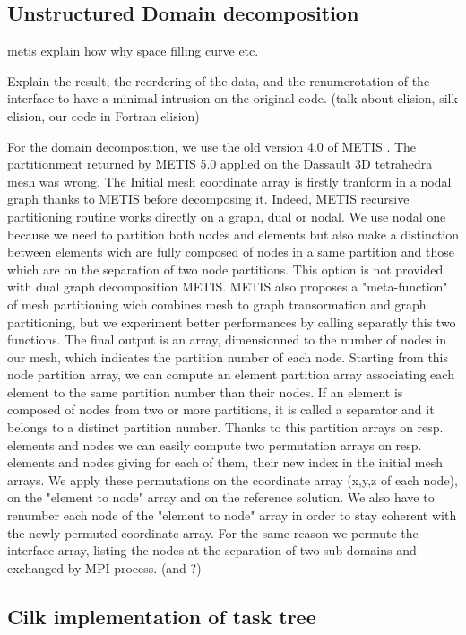\documentclass{IOS-Book-Article}
\begin{document}
\subsection{Unstructured Domain decomposition}

metis explain how why space filling curve etc.

Explain the result, the reordering of the data, and the renumerotation of the interface to have a minimal intrusion on the original code.
(talk about elision, silk elision, our code in Fortran elision)

For the domain decomposition, we use the old version 4.0 of METIS . The partitionment returned by METIS 5.0 applied on the Dassault 3D tetrahedra mesh was wrong.
The Initial mesh coordinate array is firstly tranform in a nodal graph thanks to METIS before decomposing it. Indeed, METIS recursive partitioning routine works directly
on a graph, dual or nodal. We use nodal one because we need to partition both nodes and elements but also make a distinction between elements wich are fully composed of
nodes in a same partition and those which are on the separation of two node partitions. This option is not provided with dual graph decomposition METIS.
METIS also proposes a "meta-function" of mesh partitioning wich combines mesh to graph transormation and graph partitioning, but we experiment better performances by
calling separatly this two functions.
The final output is an array, dimensionned to the number of nodes in our mesh, which indicates the partition number of each node.
Starting from this node partition array, we can compute an element partition array associating each element to the same partition number than their nodes.
If an element is composed of nodes from two or more partitions, it is called a separator and it belongs to a distinct partition number.
Thanks to this partition arrays on resp. elements and nodes we can easily compute two permutation arrays on resp. elements and nodes giving for each of them, their new
index in the initial mesh arrays. We apply these permutations on the coordinate array (x,y,z of each node), on the "element to node" array and on the reference solution.
We also have to renumber each node of the "element to node" array in order to stay coherent with the newly permuted coordinate array. For the same reason we permute the
interface array, listing the nodes at the separation of two sub-domains and exchanged by MPI process. (and ?)

\subsection{Cilk implementation of task tree}
\end{document}
